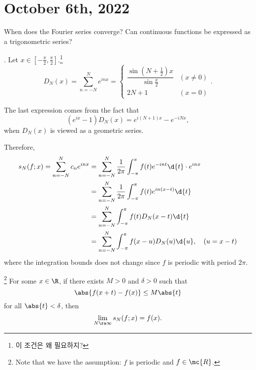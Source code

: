 \section*{October 6th, 2022}

When does the Fourier series converge? Can continuous functions be expressed as a trigonometric series?

.  Let \(x \in [-\frac{\pi}{2}, \frac{\pi}{2}]\).\footnote{이 조건은 왜 필요하지?}
\[
    D_N(x) = \sum_{n = -N}^N e^{inx} = \begin{cases}
        \dfrac{\sin\left(N + \frac{1}{2}\right)x}{\sin\frac{x}{2}} & (x\neq 0) \\
        2N + 1                                                     & (x = 0)
    \end{cases}.
\]

The last expression comes from the fact that
\[
    (e^{ix} - 1) D_N(x) = e^{i(N+1)x} - e^{-iNx},
\]
when \(D_N(x)\) is viewed as a geometric series.

Therefore,
\[
    \begin{aligned}
        s_N(f; x) = \sum_{n=-N}^N c_n e^{inx} & = \sum_{n = -N}^N \frac{1}{2\pi}\int_{-\pi}^\pi f(t)e^{-int} \d{t} \cdot e^{inx} \\
                                              & = \sum_{n = -N}^N \frac{1}{2\pi}\int_{-\pi}^\pi f(t)e^{in(x - t)} \d{t}          \\
                                              & = \sum_{n = -N}^N \int_{-\pi}^\pi f(t) D_N(x-t) \d{t}                            \\
                                              & = \sum_{n = -N}^N \int_{-\pi}^\pi f(x - u) D_N(u) \d{u}, \quad (u = x - t)
    \end{aligned}
\]
where the integration bounds does not change since \(f\) is periodic with period \(2\pi\).

 \footnote{Note that we have the assumption: \(f\) is periodic and \(f \in \mc{R}\).} For some \(x \in \R\), if there exists \(M > 0\) and \(\delta > 0\) such that
\[
    \abs{f(x + t) - f(x)} \leq M\abs{t}
\]
for all \(\abs{t} < \delta\), then
\[
    \lim_{N \ra\infty} s_N(f; x) = f(x).
\]

